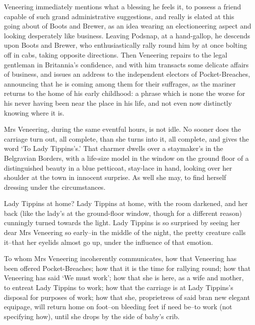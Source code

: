 Veneering immediately mentions what a blessing he feels it, to possess
a friend capable of such grand administrative suggestions, and really
is elated at this going about of Boots and Brewer, as an idea wearing
an electioneering aspect and looking desperately like business. Leaving
Podsnap, at a hand-gallop, he descends upon Boots and Brewer, who
enthusiastically rally round him by at once bolting off in cabs, taking
opposite directions. Then Veneering repairs to the legal gentleman in
Britannia’s confidence, and with him transacts some delicate affairs
of business, and issues an address to the independent electors of
Pocket-Breaches, announcing that he is coming among them for their
suffrages, as the mariner returns to the home of his early childhood: a
phrase which is none the worse for his never having been near the place
in his life, and not even now distinctly knowing where it is.

Mrs Veneering, during the same eventful hours, is not idle. No sooner
does the carriage turn out, all complete, than she turns into it, all
complete, and gives the word ‘To Lady Tippins’s.’ That charmer dwells
over a staymaker’s in the Belgravian Borders, with a life-size model
in the window on the ground floor of a distinguished beauty in a blue
petticoat, stay-lace in hand, looking over her shoulder at the town in
innocent surprise. As well she may, to find herself dressing under the
circumstances.

Lady Tippins at home? Lady Tippins at home, with the room darkened,
and her back (like the lady’s at the ground-floor window, though for a
different reason) cunningly turned towards the light. Lady Tippins is
so surprised by seeing her dear Mrs Veneering so early--in the middle of
the night, the pretty creature calls it--that her eyelids almost go up,
under the influence of that emotion.

To whom Mrs Veneering incoherently communicates, how that Veneering
has been offered Pocket-Breaches; how that it is the time for rallying
round; how that Veneering has said ‘We must work’; how that she is here,
as a wife and mother, to entreat Lady Tippins to work; how that the
carriage is at Lady Tippins’s disposal for purposes of work; how that
she, proprietress of said bran new elegant equipage, will return home on
foot--on bleeding feet if need be--to work (not specifying how), until
she drops by the side of baby’s crib.

